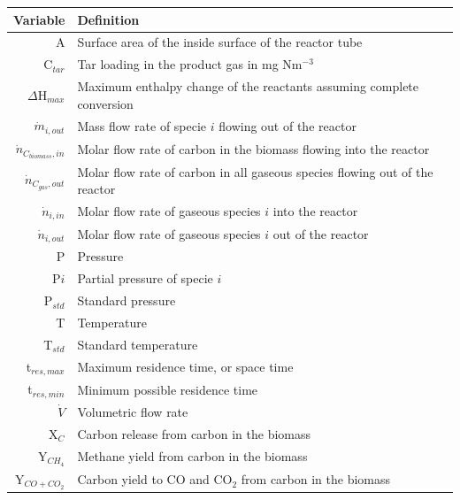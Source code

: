 \documentclass[11pt,twocolumn]{article}
\begin{document}
\begin{minipage}{\textwidth}
\centering
{}
\begin{tabular}{r l}
\toprule
Variable					&	Definition	\\
\midrule
A						&	Surface area of the inside surface of the reactor tube		\\
C$_{tar}	$				&	Tar loading in the product gas in mg Nm$^{-3}$	\\
$\Delta$H$_{max}$			&	Maximum enthalpy change of the reactants assuming complete conversion	\\
$\dot{m}_{i,out}$			&	Mass flow rate of specie $i$ flowing out of the reactor	\\
$\dot{n}_{C_{biomass},in}$	&	Molar flow rate of carbon in the biomass flowing into the reactor	\\
$\dot{n}_{C_{gas},out}$		&	Molar flow rate of carbon in all gaseous species flowing out of the reactor	\\
$\dot{n}_{i,in}	$			&	Molar flow rate of gaseous species $i$ into the reactor	\\
$\dot{n}_{i,out}$			&	Molar flow rate of gaseous species $i$ out of the reactor	\\
P						&	Pressure	\\
P${i}$					&	Partial pressure of specie $i$	\\
P$_{std}$					&	Standard pressure	\\
T						&	Temperature	\\
T$_{std}$					&	Standard temperature	\\
t$_{res,max}$				& 	Maximum residence time, or space time	\\
t$_{res,min}$				&	Minimum possible residence time	\\
$\dot{V}$					&	Volumetric flow rate	\\
X$_{C}$					&	Carbon release from carbon in the biomass	\\
Y$_{CH_4}$				&	Methane yield from carbon in the biomass \\
Y$_{CO+CO_2}	$			&	Carbon yield to CO and CO$_2$ from carbon in the biomass	\\
\bottomrule
\end{tabular}
\end{minipage}
\end{document}
